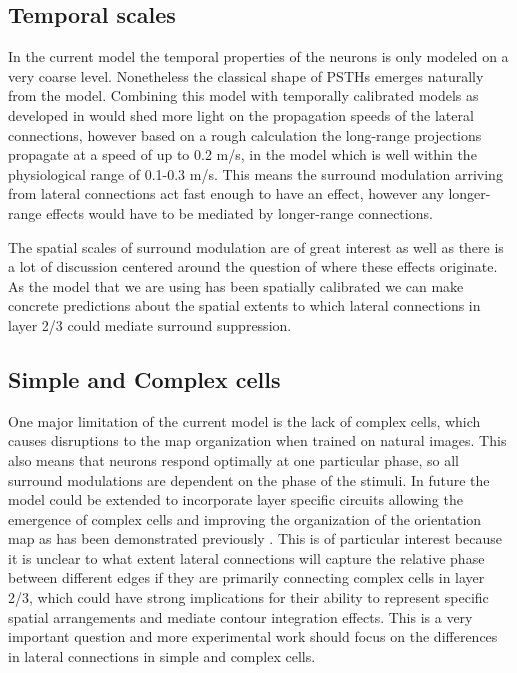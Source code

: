 \subsection{Temporal scales}

In the current model the temporal properties of the neurons is only
modeled on a very coarse level. Nonetheless the classical shape of
PSTHs emerges naturally from the model. Combining this model with
temporally calibrated models as developed in \citep{Stevens2016}
would shed more light on the propagation speeds of the lateral
connections, however based on a rough calculation the long-range
projections propagate at a speed of up to 0.2 m/s, in the model which
is well within the physiological range of 0.1-0.3 m/s. This means the
surround modulation arriving from lateral connections act fast enough
to have an effect, however any longer-range effects would have to be
mediated by longer-range connections.

The spatial scales of surround modulation are of great interest as
well as there is a lot of discussion centered around the question of
where these effects originate. As the model that we are using has been
spatially calibrated we can make concrete predictions about the
spatial extents to which lateral connections in layer 2/3 could
mediate surround suppression.

\subsection{Simple and Complex cells}

One major limitation of the current model is the lack of complex
cells, which causes disruptions to the map organization when trained
on natural images. This also means that neurons respond optimally at
one particular phase, so all surround modulations are dependent on the
phase of the stimuli. In future the model could be extended to
incorporate layer specific circuits allowing the emergence of complex
cells and improving the organization of the orientation map as has
been demonstrated previously \citep{Antolik2010}. This is of
particular interest because it is unclear to what extent lateral
connections will capture the relative phase between different edges if
they are primarily connecting complex cells in layer 2/3, which could
have strong implications for their ability to represent specific
spatial arrangements and mediate contour integration effects. This is
a very important question and more experimental work should focus on
the differences in lateral connections in simple and complex cells.

